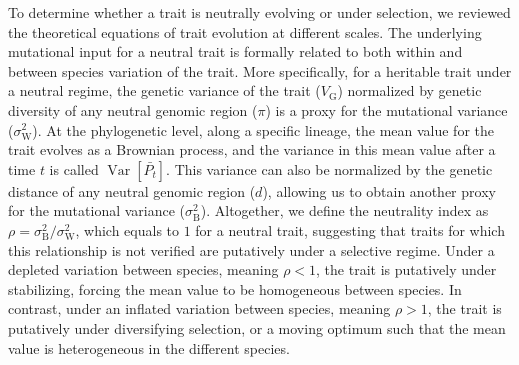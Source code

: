 \documentclass{article}
\DeclareMathOperator{\Var}{\text{Var}}
\newcommand{\Time}{t}
\newcommand{\Trait}{P}
\newcommand{\MeanTrait}{\bar{\Trait_{\Time}}}
\newcommand{\VarPhy}{\Var \left[\MeanTrait\right]}
\newcommand{\VarGenetic}{V_{\mathrm{G}}}
\newcommand{\RatePhy}{\sigma^2_{\mathrm{B}}}
\newcommand{\RatePop}{\sigma^2_{\mathrm{W}}}
\newcommand{\NI}{\rho}
\begin{document}
To determine whether a trait is neutrally evolving or under selection, we reviewed the theoretical equations of trait evolution at different scales.
The underlying mutational input for a neutral trait is formally related to both within and between species variation of the trait.
More specifically, for a heritable trait under a neutral regime, the genetic variance of the trait ($\VarGenetic$) normalized by genetic diversity of any neutral genomic region ($\pi$) is a proxy for the mutational variance ($\RatePop$).
At the phylogenetic level, along a specific lineage, the mean value for the trait evolves as a Brownian process, and the variance in this mean value after a time $\Time$ is called $\VarPhy$.
This variance can also be normalized by the genetic distance of any neutral genomic region ($d$), allowing us to obtain another proxy for the mutational variance ($\RatePhy$).
Altogether, we define the neutrality index as $\NI = \RatePhy/\RatePop$, which equals to $1$ for a neutral trait, suggesting that traits for which this relationship is not verified are putatively under a selective regime.
Under a depleted variation between species, meaning $\NI < 1$, the trait is putatively under stabilizing, forcing the mean value to be homogeneous between species.
In contrast, under an inflated variation between species, meaning $\NI > 1$, the trait is putatively under diversifying selection, or a moving optimum such that the mean value is heterogeneous in the different species.
\end{document}
